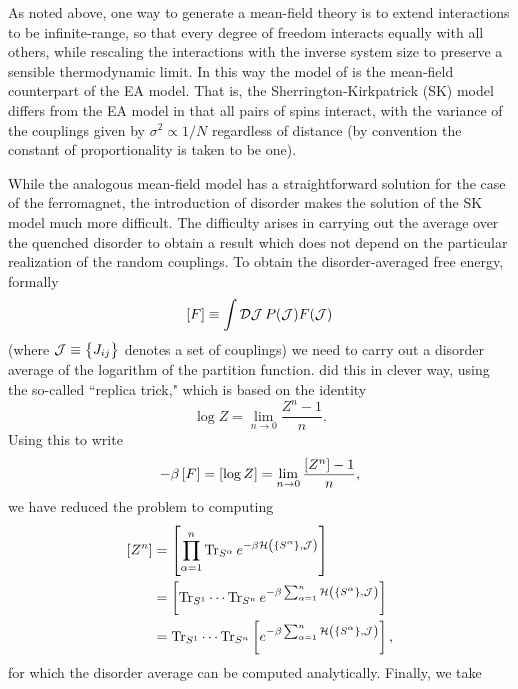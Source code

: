 As noted above, one way to generate a mean-field theory is to extend
interactions to be infinite-range, so that every degree of freedom interacts
equally with all others, while rescaling the interactions with the inverse
system size to preserve a sensible thermodynamic limit. In this way the model
of \textcite{sherrington1975solvable} is the mean-field counterpart of the EA
model. That is, the Sherrington-Kirkpatrick (SK) model differs from the EA
model in that all pairs of spins interact, with the variance of the couplings
given by $\sigma^2 \propto 1/N$ regardless of distance (by convention the
constant of proportionality is taken to be one).

While the analogous mean-field model has a straightforward solution for the
case of the ferromagnet, the introduction of disorder makes the solution of the
SK model much more difficult. The difficulty arises in carrying out the average
over the quenched disorder to obtain a result which does not depend on the
particular realization of the random couplings. To obtain the disorder-averaged
free energy, formally
\newcommand{\JJ}{\mathcal{J}}
\begin{equation}
  \davc{F} \equiv \int \mathcal{D}\JJ \, P(\JJ) F(\JJ)
\end{equation}
(where $\JJ \equiv \cbr{J_{ij}}$ denotes a set of couplings) we need to carry
out a disorder average of the logarithm of the partition function.
\textcite{sherrington1975solvable} did this in clever way, using the so-called
``replica trick," which is based on the identity
\begin{equation}
  \log Z = \lim_{n \to 0} \frac{Z^n-1}{n}.
\end{equation}
Using this to write
\begin{equation}
  -\beta \left[F\right]
  = \left[\log Z\right]
  = \lim_{n \to 0} \frac{\left[Z^n\right]-1}{n},
\end{equation}
we have reduced the problem to computing
\begin{align*}
  \davc{Z^n}
  &=\davc{\prod_{\alpha=1}^n \Tr_{S^{\alpha}}
    e^{-\beta\ham\del{\cbr{S^{\alpha}},\JJ}}} \\
  &=\davc{\Tr_{S^{1}} \cdots \Tr_{S^{n}}
    e^{-\beta\sum_{\alpha=1}^n
    \ham\del{\cbr{S^{\alpha}},\JJ}}} \\
  &=\Tr_{S^{1}} \cdots \Tr_{S^{n}}
    \davc{e^{-\beta\sum_{\alpha=1}^n
    \ham\del{\cbr{S^{\alpha}},\JJ}}},
\end{align*}
for which the disorder average can be computed analytically. Finally, we take
